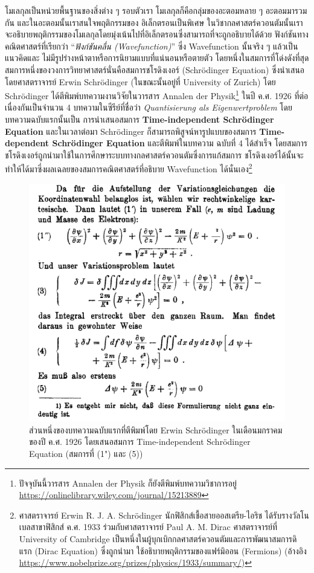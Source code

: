 โมเลกุลเป็นหน่วยพื้นฐานของสิ่งต่าง ๆ รอบตัวเรา โมเลกุลก็คือกลุ่มของอะตอมหลาย ๆ อะตอมมารวมกัน และในอะตอมนั้นเราสนใจพฤติกรรมของ%
อิเล็กตรอนเป็นพิเศษ ในวิชากลศาสตร์ควอนตัมนั้นเราจะอธิบายพฤติกรรมของโมเลกุลโดยมุ่งเน้นไปที่อิเล็กตรอนซึ่งสามารถที่จะถูกอธิบายได้ด้วย%
ฟังก์ชันทางคณิตศาสตร์ที่เรียกว่า \enquote{\textit{ฟังก์ชันคลื่น (Wavefunction)}} ซึ่ง Wavefunction นั้นจริง ๆ แล้วเป็นแนวคิดและ%
ไม่มีรูปร่างหน้าตาหรือการนิยามแบบที่แน่นอนหรือตายตัว โดยหนึ่งในสมการที่โด่งดังที่สุดสมการหนึ่งของวงการวิทยาศาสตร์นั่นคือสมการชโรดิงเงอร์ 
(Schr\"{o}dinger Equation)\autocite{schleich2013} ซึ่งนำเสนอโดยศาสตราจารย์ Erwin Schr\"{o}dinger (ในขณะนั้นอยู่ที่ 
University of Zurich) โดย Schr\"{o}dinger ได้ตีพิมพ์บทความงานวิจัยในวารสาร Annalen der Physik\footnote{ปัจจุบันนี้วารสาร
Annalen der Physik ก็ยังตีพิมพ์บทความวิชาการอยู่ \url{https://onlinelibrary.wiley.com/journal/15213889}} ในปี ค.ศ. 
1926 ที่ต่อเนื่องกันเป็นจำนวน 4 บทความในซีรีย์ที่ชื่อว่า \textit{Quantisierung als Eigenwertproblem} โดยบทความฉบับแรกนั้นเป็น%
การนำเสนอสมการ \textbf{Time-independent Schr\"{o}dinger Equation}\autocite{schrodinger1926} และในเวลาต่อมา 
Schr\"{o}dinger ก็สามารถพิสูจน์หารูปแบบของสมการ \textbf{Time-dependent Schr\"{o}dinger Equation} และตีพิมพ์ในบทความ%
ฉบับที่ 4 ได้สำเร็จ\autocite{schrodinger1926a} โดยสมการชโรดิงเงอร์ถูกนำมาใช้ในการศึกษาระบบทางกลศาสตร์ควอนตัมซึ่งการแก้สมการ%
ชโรดิงเงอร์ได้นั้นจะทำให้ได้มาซึ่งผลเฉลยของสมการคณิตศาสตร์ที่อธิบาย Wavefunction ได้นั่นเอง\footnote{ศาสตราจารย์ Erwin R. J. A.
Schr\"{o}dinger นักฟิสิกส์เชื้อสายออสเตรีย-ไอริช ได้รับรางวัลโนเบลสาขาฟิสิกส์ ค.ศ. 1933 ร่วมกับศาสตราจารย์ Paul A. M. Dirac 
ศาสตราจารย์ที่ University of Cambridge เป็นหนึ่งในผู้บุกเบิกกลศาสตร์ควอนตัมและการพัฒนาสมการดิแรก (Dirac Equation) ซึ่งถูกนำมา%
ใช้อธิบายพฤติกรรมของแฟร์มิออน (Fermions) (อ้างอิง \url{https://www.nobelprize.org/prizes/physics/1933/summary/})} 

\begin{figure}[H]
    \centering
    \includegraphics[width=0.8\linewidth]{fig/time-inde-schrodinger-eq.png}
    \caption{ส่วนหนึ่งของบทความฉบับแรกที่ตีพิมพ์โดย Erwin Schr\"{o}dinger ในเดือนมกราคมของปี ค.ศ. 1926 โดยเสนอสมการ 
    Time-independent Schr\"{o}dinger Equation (สมการที่ (1") และ (5))}
    \label{fig:schrodinger_paper_1}
\end{figure}

